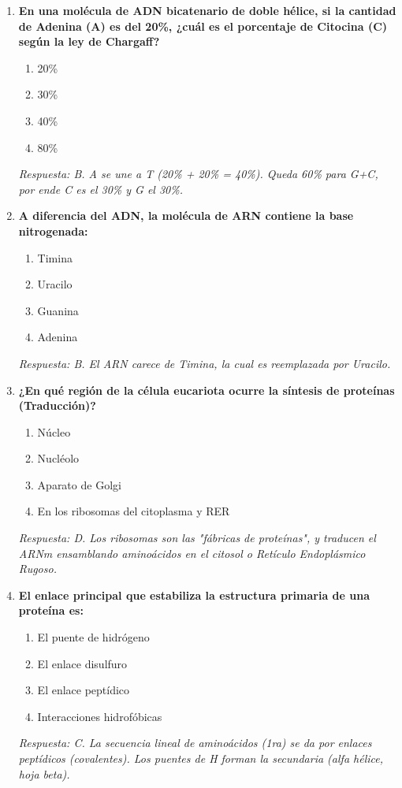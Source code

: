 \begin{enumerate}[label=\textbf{\arabic*.}]
    \item \textbf{En una molécula de ADN bicatenario de doble hélice, si la cantidad de Adenina (A) es del 20\%, ¿cuál es el porcentaje de Citocina (C) según la ley de Chargaff?}
    \begin{enumerate}
        \item[A)] 20\%
        \item[B)] 30\%
        \item[C)] 40\%
        \item[D)] 80\%
    \end{enumerate}
    \textit{Respuesta: B. A se une a T (20\% + 20\% = 40\%). Queda 60\% para G+C, por ende C es el 30\% y G el 30\%.}

    \item \textbf{A diferencia del ADN, la molécula de ARN contiene la base nitrogenada:}
    \begin{enumerate}
        \item[A)] Timina
        \item[B)] Uracilo
        \item[C)] Guanina
        \item[D)] Adenina
    \end{enumerate}
    \textit{Respuesta: B. El ARN carece de Timina, la cual es reemplazada por Uracilo.}

    \item \textbf{¿En qué región de la célula eucariota ocurre la síntesis de proteínas (Traducción)?}
    \begin{enumerate}
        \item[A)] Núcleo
        \item[B)] Nucléolo
        \item[C)] Aparato de Golgi
        \item[D)] En los ribosomas del citoplasma y RER
    \end{enumerate}
    \textit{Respuesta: D. Los ribosomas son las "fábricas de proteínas", y traducen el ARNm ensamblando aminoácidos en el citosol o Retículo Endoplásmico Rugoso.}

    \item \textbf{El enlace principal que estabiliza la estructura primaria de una proteína es:}
    \begin{enumerate}
        \item[A)] El puente de hidrógeno
        \item[B)] El enlace disulfuro
        \item[C)] El enlace peptídico
        \item[D)] Interacciones hidrofóbicas
    \end{enumerate}
    \textit{Respuesta: C. La secuencia lineal de aminoácidos (1ra) se da por enlaces peptídicos (covalentes). Los puentes de H forman la secundaria (alfa hélice, hoja beta).}


\end{enumerate}
